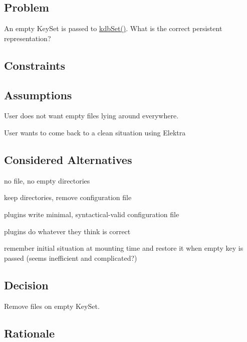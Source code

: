 \subsection*{Problem}

An empty Key\+Set is passed to \hyperlink{group__kdb_ga11436b058408f83d303ca5e996832bcf}{kdb\+Set()}. What is the correct persistent representation?

\subsection*{Constraints}

\subsection*{Assumptions}


\begin{DoxyItemize}
\item User does not want empty files lying around everywhere.
\item User wants to come back to a clean situation using Elektra
\end{DoxyItemize}

\subsection*{Considered Alternatives}


\begin{DoxyItemize}
\item no file, no empty directories
\item keep directories, remove configuration file
\item plugins write minimal, syntactical-\/valid configuration file
\item plugins do whatever they think is correct
\item remember initial situation at mounting time and restore it when empty key is passed (seems inefficient and complicated?)
\end{DoxyItemize}

\subsection*{Decision}

Remove files on empty Key\+Set.

\subsection*{Rationale}


